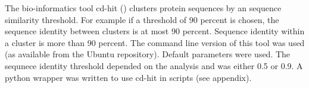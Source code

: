 The bio-informatics tool cd-hit (\cite{fu2012}) clusters protein sequences by an sequence similarity threshold.
For example if a threshold of 90 percent is chosen,
the sequence identity between clusters is at most 90 percent.
Sequence identity within a cluster is more than 90 percent.
The command line version of this tool was used (as available from the Ubuntu repository).
Default parameters were used. 
The sequnece identity threshold depended on the analysis and was either 0.5 or 0.9. 
A python wrapper was written to use cd-hit in scripts (see appendix).

